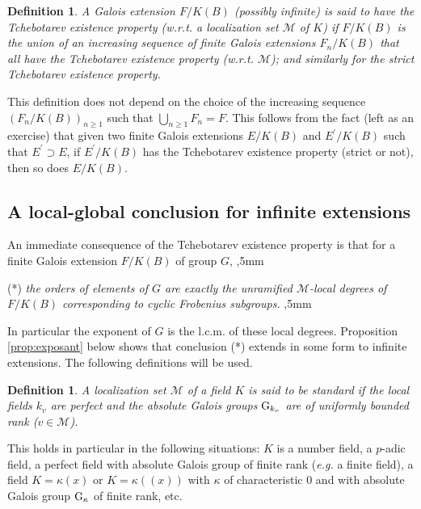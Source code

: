 \documentclass[12pt,english]{amsart}
\newtheorem{twisting lemma}[theorem]{Twisting lemma}
\newtheorem{definition}[theorem]{Definition}
\begin{document}
\begin{definition} A Galois extension $F/K(B)$ (possibly infinite) 
is said to have the {\it Tchebotarev existence property} (w.r.t. a localization set ${\mathcal M}$ of $K$) if $F/K(B)$ is the union of an increasing sequence of finite Galois extensions $F_n/K(B)$ 
that all have the 
Tchebotarev existence property (w.r.t. ${\mathcal M}$); and similarly for the {\it strict Tchebotarev existence property}. 
\end{definition}

This definition does not depend on the choice of the increasing sequence $(F_n/K(B))_{n\geq 1}$  such that $\bigcup_{n\geq 1} F_n = F$. This follows from the fact (left as an exercise) that given two finite Galois extensions $E/K(B)$ and $E^\prime/K(B)$ such that $E^\prime\supset E$, if $E^\prime/K(B)$ has the Tchebotarev existence property (strict or not), then so does $E/K(B)$. 

\subsection{A local-global conclusion for infinite extensions} \label{ssec:loc-glob-conclusion}
An immediate consequence of the Tchebotarev existence property is that for a finite Galois extension 
$F/K(B)$ of group $G$,
,5mm

\noindent
{\rm (*)} {\it the orders of elements of $G$ are exactly the unramified ${\mathcal M}$-local degrees of $F/K(B)$ corresponding to cyclic Frobenius subgroups.}
,5mm

\noindent
In particular the exponent of $G$ is the {l.c.m.} of these local degrees.  
Proposition \ref{prop:exposant} below shows that conclusion (*) extends in some form to infinite extensions.
The following definitions will be used.

\begin{definition} \label{def:standard}
A localization set ${\mathcal M}$ of a field $K$ is said to be {\it standard} if the local fields $k_v$ are perfect and the absolute Galois groups ${\hbox{\rm G}}_{k_v}$ are of uniformly bounded rank {\rm (}$v\in {\mathcal M}${\rm )}.

\end{definition}
\vskip -1mm

This holds in particular in the following situations: $K$ is a number field, a $p$-adic field, 
a perfect field with absolute Galois group of finite rank ({\it e.g.} a finite field), 
a field $K=\kappa(x)$ or $K=\kappa((x))$ with $\kappa$ of characteristic $0$ and with absolute Galois group ${\hbox{\rm G}}_\kappa$ of finite rank, etc.
\vskip 1mm
\end{document}

